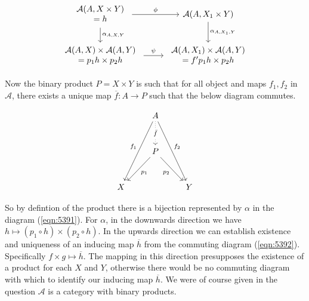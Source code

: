 \documentclass{article}
\begin{document}
\begin{equation}
  \label{eqn:5391}
  \begin{tikzcd}
    \begin{array}{c}
      \mathcal{A}(A, X \times Y) \\
      = h
    \end{array}
    \arrow[r, "\phi"] \arrow[d, "\alpha_{A,X,Y}"]
    & \mathcal{A}(A, X_1 \times Y) \arrow[d, "\alpha_{A,X_1,Y}"] \\
    \begin{array}{c}
      \mathcal{A}(A,X) \times \mathcal{A}(A,Y) \\
      = p_1h \times p_2h
    \end{array}
    \arrow[r, "\psi"]
    &
    \begin{array}{c}
      \mathcal{A}(A,X_1) \times \mathcal{A}(A,Y) \\
      = f^\prime p_1h \times p_2h
    \end{array}
  \end{tikzcd}
\end{equation}

Now the binary product $P = X \times Y$ is such that for all object and maps $f_1, f_2$ in $\mathcal{A}$, there exists a unique map $\overline{f} \colon A \rightarrow P$ such that the below diagram commutes.

\begin{equation}
  \label{eqn:5392}
  \begin{tikzcd}[row sep=1cm]
    &A\arrow[ddl,"f_1"']\arrow[ddr,"f_2"]\arrow[d,dotted,"\bar{f}" description]\\
    &P\arrow[dl,"p_1"]\arrow[dr,"p_2"']\\
    X&&Y
  \end{tikzcd}
\end{equation}

So by defintion of the product there is a bijection represented by $\alpha$ in the diagram (\ref{eqn:5391}). For $\alpha$, in the downwards direction we have $h \mapsto (p_1\circ h) \times (p_2 \circ h)$. In the upwards direction we can establish existence and uniqueness of an inducing map $\overline{h}$ from the commuting diagram (\ref{eqn:5392}). Specifically $f \times g \mapsto \overline{h}$. The mapping in this direction presupposes the existence of a product for each $X$ and $Y$, otherwise there would be no commuting diagram with which to identify our inducing map $\overline{h}$. We were of course given in the question $\mathcal{A}$ is a category with binary products.
\end{document}
